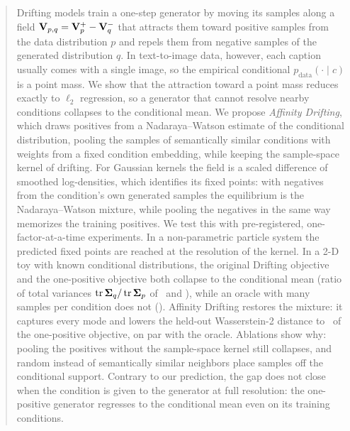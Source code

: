 \begin{abstract}
Drifting models train a one-step generator by moving its samples along a field $\V_{p,q}=\Vp-\Vn$ that attracts them
toward positive samples from the data distribution $p$ and repels them from negative samples of the generated
distribution $q$. In text-to-image data, however, each caption usually comes with a single image, so the empirical
conditional $p_\mathrm{data}(\cdot\mid c)$ is a point mass. We show that the attraction toward a point mass reduces
exactly to $\ell_2$ regression, so a generator that cannot resolve nearby conditions collapses to the conditional mean.
We propose \emph{Affinity Drifting}, which draws positives from a Nadaraya--Watson estimate of the conditional
distribution, pooling the samples of semantically similar conditions with weights from a fixed condition embedding,
while keeping the sample-space kernel of drifting. For Gaussian kernels the field is a scaled difference of smoothed
log-densities, which identifies its fixed points: with negatives from the condition's own generated samples the
equilibrium is the Nadaraya--Watson mixture, while pooling the negatives in the same way memorizes the training
positives. We test this with pre-registered, one-factor-at-a-time experiments. In a non-parametric particle system
the predicted fixed points are reached at the resolution of the kernel. In a 2-D toy with known conditional
distributions, the original Drifting objective and the one-positive objective both collapse to the conditional mean
(ratio of total variances $\operatorname{tr}\Cov_q/\operatorname{tr}\Cov_p$ of \EOneTwoDriftingTVRMean\ and
\EOneTwoSingleTVRMean), while an oracle with many samples per condition does not (\EOneTwoOracleTVRMean). Affinity Drifting
restores the mixture: it captures every mode and lowers the held-out Wasserstein-2 distance to \EOneThreeRatio\ of the
one-positive objective, on par with the oracle. Ablations show why: pooling the positives without the sample-space
kernel still collapses, and random instead of semantically similar neighbors place samples off the conditional
support. Contrary to our prediction, the gap does not close when the condition is given to the generator at full
resolution: the one-positive generator regresses to the conditional mean even on its training conditions.
\end{abstract}
